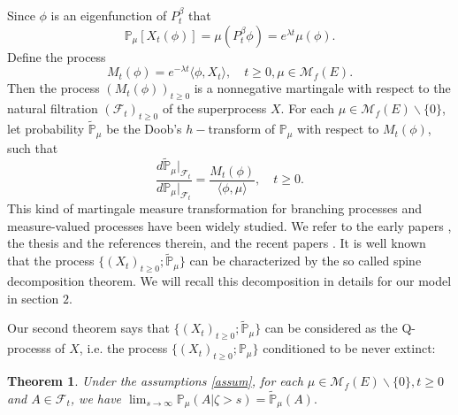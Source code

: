 \documentclass[12pt,a4paper]{amsart}
\numberwithin{equation}{section}
\theoremstyle{plain}
\newtheorem{thm}{Theorem}[section]
\theoremstyle{definition}
\theoremstyle{remark}
\begin{document}
Since $\phi$ is an eigenfunction of $P_t^\beta$ that
\begin{equation}
	\mathbb P_\mu[X_t(\phi)]= \mu(P_t^\beta \phi)=e^{\lambda t}\mu(\phi).
\end{equation}
Define the process
\[
	M_t(\phi)=e^{-\lambda t}  \langle \phi, X_t\rangle, \quad t\geq 0, \mu\in\mathcal M_f(E).
\]
Then the process  $(M_t(\phi))_{t\geq 0}$ is a nonnegative martingale with respect to the natural filtration $(\mathscr F_t)_{t\geq 0}$ of the superprocess $X$.
For each $\mu \in \mathcal M_f(E)\backslash\{0\}$, let probability $\widetilde{\mathbb P}_\mu$ be the Doob's $h-$transform of $\mathbb P_\mu$ with respect to $M_t(\phi)$, such that
\begin{equation} \label{eq: martingale transformation}
	\frac{d\widetilde{\mathbb P}_\mu|_{\mathscr F_t}}{d\mathbb P_\mu|_{\mathscr F_t}}
	=\frac{M_t(\phi)}{\langle\phi,\mu\rangle },
	\quad t\geq 0.
\end{equation}
	This kind of martingale measure transformation for branching processes and measure-valued processes have been widely studied.
	We refer to the early papers \cite{EnglanderKyprianou2004Local,Evans1993Two,RoellyRouault1989Processus}, the thesis \cite{Penisson2010Conditional} and the references therein, and the recent papers \cite{ChampagnatRoelly2008Limit,RenSongSun2017Spine,RenSongZhang2018Williams}.
	It is well known that the process $\{(X_t)_{t\geq 0}; \widetilde{\mathbb P}_{\mu}\}$ can be characterized by the so called spine decomposition theorem.
	We will recall this decomposition in details for our model in section $2$.


Our second theorem says that $\{(X_t)_{t\geq 0}; \widetilde{\mathbb P}_{\mu}\}$ can be considered as the Q-processs of $X$, i.e. the process $\{(X_t)_{t\geq 0}; \mathbb P_{\mu}\}$ conditioned to be never extinct:

\begin{thm}\label{thm: Qprocess}
	Under the assumptions \ref{assum}, for each $\mu \in \mathcal M_f(E)\backslash\{0\}, t\geq 0$ and $A\in\mathscr F_t$, we have
$
	\lim_{s\rightarrow\infty}\mathbb P_\mu(A |\zeta>s)=\widetilde{\mathbb P}_\mu(A).
$
\end{thm}
\end{document}
